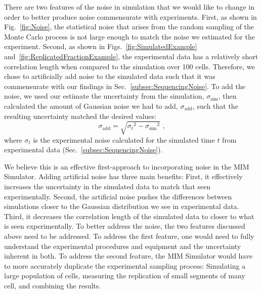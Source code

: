 		There are two features of the noise in simulation that we would like to change in order to better produce noise commensurate with experiments.
		First, as shown in Fig.~\ref{fig:Noise}, the statistical noise that arises from the random sampling of the Monte Carlo process is not large enough to match the noise we estimated for the experiment.
		Second, as shown in Figs.~\ref{fig:SimulatedExample} and~\ref{fig:ReplicatedFractionExample}, the experimental data has a relatively short correlation length when compared to the simulation over 100 cells.
		Therefore, we chose to artificially add noise to the simulated data such that it was commensurate with our findings in Sec.~\ref{subsec:SequencingNoise}.
		To add the noise, we used our estimate the uncertainty from the simulation, $\sigma_\text{sim}$, then calculated the amount of Gaussian noise we had to add, $\sigma_\text{add}$, such that the resulting uncertainty matched the desired values:
		\begin{equation}
			\sigma_\text{add} = \sqrt{{\sigma_t}^2 - {\sigma_\text{sim}}^2} \text{ ,}
		\end{equation}
		where $\sigma_t$ is the experimental noise calculated for the simulated time $t$ from experimental data (Sec.~\ref{subsec:SequencingNoise}).
		
		We believe this is an effective first-approach to incorporating noise in the MIM Simulator.
		Adding artificial noise has three main benefits:
		First, it effectively increases the uncertainty in the simulated data to match that seen experimentally.
		Second, the artificial noise pushes the differences between simulations closer to the Gaussian distribution we see in experimental data.
		Third, it decreases the correlation length of the simulated data to closer to what is seen experimentally.
		To better address the noise, the two features discussed above need to be addressed.
		To address the first feature, one would need to fully understand the experimental procedures and equipment and the uncertainty inherent in both.
		To address the second feature, the MIM Simulator would have to more accurately duplicate the experimental sampling process:
		Simulating a large population of cells, measuring the replication of small segments of many cell, and combining the results.












































